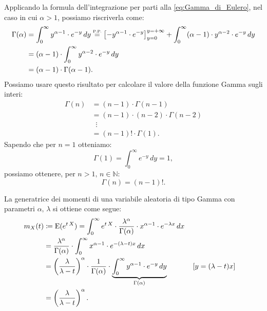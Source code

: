         \begin{obsv}
            Applicando la formula dell'integrazione per parti alla \eqref{eq:Gamma_di_Eulero}, nel caso in cui $\alpha > 1$, possiamo riscriverla come:
            \begin{align*}
                \Gamma(\alpha) &= \int_{0}^{\infty} y^{\alpha-1}\cdot e^{-y}\, dy 
                \overset{\scriptscriptstyle \text{P.P.} \textstyle}{=}
                \left[-y^{\alpha-1} \cdot e^{-y}\right]_{y=0}^{y=+\infty} + 
                \int_{0}^{\infty} (\alpha-1) \cdot y^{\alpha-2} \cdot e^{-y}\, dy \\
                &= (\alpha-1) \cdot \int_{0}^{\infty} y^{\alpha-2} \cdot e^{-y}\, dy \\
                &= (\alpha-1)\cdot \Gamma(\alpha-1)
            .\end{align*}
            Possiamo usare questo risultato per calcolare il valore della funzione Gamma sugli interi:
            \begin{align*}
                \Gamma(n) &= (n-1)\cdot \Gamma(n-1) \\
                &= (n-1)\cdot (n-2)\cdot \Gamma(n-2) \\
                &\;\; \vdots \\
                &= (n-1)! \cdot \Gamma(1)
            .\end{align*}
            Sapendo che per $n=1$ otteniamo: \[
                \Gamma(1) = \int_{0}^{\infty} e^{-y}\, dy = 1
            ,\] possiamo ottenere, per $n > 1,\, n \in \mathbb{N}$:
            \begin{equation}\label{eq:Gamma_di_Eulero_interi}
                \Gamma(n) = (n-1)!
            .\end{equation}
        \end{obsv}
        \begin{prty}
            La generatrice dei momenti di una variabile aleatoria di tipo Gamma con parametri $\alpha,\, \lambda$ si ottiene come segue:
            \begin{align}\label{eq:Generatrice_momenti_Gamma}
                m_X(t) &\coloneqq \text{E}(e^{t\, X}) =
                \int_{0}^{\infty} e^{t\, X}\cdot \frac{\lambda^{\alpha}}{\Gamma(\alpha)}\cdot x^{\alpha-1}\cdot e^{-\lambda x}\, dx \notag\\
                &= \frac{\lambda^\alpha}{\Gamma(\alpha)}\cdot \int_{0}^{\infty} x^{\alpha-1} \cdot e^{-(\lambda-t)x}\, dx \notag\\
                &= \left(\frac{\lambda}{\lambda-t}\right)^\alpha \cdot 
                \frac{1}{\Gamma(\alpha)}\cdot 
                \underset{\Gamma(\alpha)}{\underbrace{\int_{0}^{\infty} y^{\alpha-1}\cdot e^{-y}\, dy}} 
                & & \left[y = (\lambda-t)x\right] \notag\\
                &= \left(\frac{\lambda}{\lambda-t}\right)^\alpha
            .\end{align}
        \end{prty}
